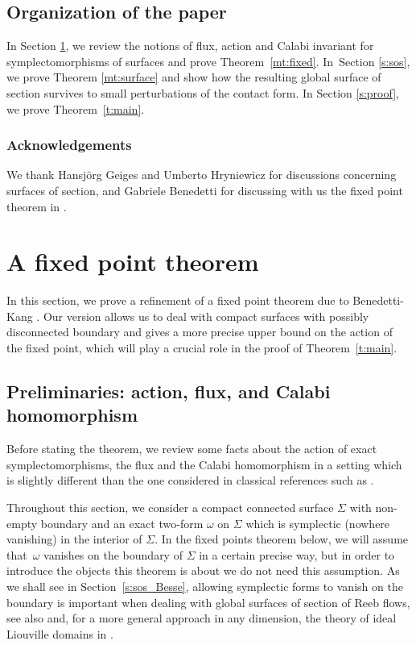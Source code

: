 \documentclass[JEP,XML,SOM,Unicode,published]{cedram}
\theoremstyle{definition}
\begin{document}
\subsection{Organization of the paper}
In Section \ref{s:fixed_point}, we review the notions of flux, action and Calabi invariant for symplectomorphisms of surfaces and prove Theorem~\ref{mt:fixed}. In~Section \ref{s:sos}, we prove Theorem \ref{mt:surface} and show how the resulting global surface of section survives to small perturbations of the contact form. In Section \ref{s:proof}, we prove Theorem~\ref{t:main}.

\subsubsection*{Acknowledgements}
We thank Hansjörg Geiges and Umberto Hryniewicz for discussions concerning surfaces of section, and Gabriele Benedetti for discussing with us the fixed point theorem in \cite{Benedetti:2021aa}.

\section{A fixed point theorem}
\label{s:fixed_point}

In this section, we prove a refinement of a fixed point theorem due to Benedetti-Kang \cite[\S 4.4]{Benedetti:2021aa}. Our version allows us to deal with compact surfaces with possibly disconnected boundary and gives a more precise upper bound on the action of the fixed point, which will play a crucial role in the proof of Theorem~\ref{t:main}.

\subsection{Preliminaries: action, flux, and Calabi homomorphism}
Before stating the theorem, we review some facts about the action of exact symplectomorphisms, the flux and the Calabi homomorphism in a setting which is slightly different than the one considered in classical references such as \cite{Calabi:1970,Banyaga:1978,Banyaga:1997,McDuff:1998uu}.

Throughout this section, we consider a compact connected surface $\Sigma$ with non-empty boundary and an exact two-form $\omega$ on $\Sigma$ which is symplectic (\ie nowhere vanishing) in the interior of $\Sigma$. In the fixed points theorem below, we will assume that~$\omega$ vanishes on the boundary of $\Sigma$ in a certain precise way, but in order to introduce the objects this theorem is about we do not need this assumption. As we shall see in Section~\ref{s:sos_Besse}, allowing symplectic forms to vanish on the boundary is important when dealing with global surfaces of section of Reeb flows, see also \cite{Abbondandolo:2018fb,Benedetti:2021aa} and, for a more general approach in any dimension, the theory of ideal Liouville domains in \cite{Giroux:2020}.
\end{document}
